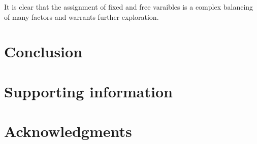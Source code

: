 \documentclass[10pt,letterpaper]{article}
\begin{document}
It is clear that the assignment of fixed and free varaibles is a complex balancing of many factors and warrants further exploration.

%


\section*{Conclusion}



\section*{Supporting information}


\section*{Acknowledgments}

\nolinenumbers

%
%
\end{document}
